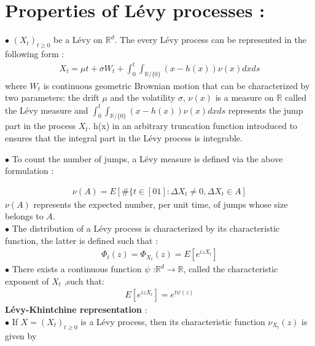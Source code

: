 \documentclass[12pt]{report}
\begin{document}
\section{Properties of  Lévy processes :}
$\bullet$  $(X_t)_{t \geqslant 0}$ be a Lévy  on $\mathbb{R}^d$. The every Lévy process can be represented in the following form :
\begin{gather}
X_t= \mu t+ \sigma W_t + \int_0^t \int_{\mathbb{R}/\{0\}} (x-h(x))\nu(x) dx ds 
\end{gather}
where $ W_t $ is continuous geometric  Brownian motion that can be characterized by two parameters: the drift $\mu$ and the volatility $\sigma$, $\nu(x)$ is a measure on $\mathbb{R}$ called the Lévy measure and  $\int_0^t\int_{\mathbb{R}/\{0\}}(x-h(x))\nu(x) dx ds$ represents the jump part in the process $X_t$. h(x) in an arbitrary truncation function introduced to ensures that the integral part in the Lévy process is integrable.\\


$\bullet$ To count the number of jumps, a Lévy measure is defined via the above formulation :

\begin{gather}
\nu(A)=E[\#\{t \in [0 1]: \Delta X_t \neq 0 , \Delta X_t \in A]
\end{gather}
$\nu(A)$ represents the expected number, per unit time, of jumps whose size belongs to $A$.\\
$\bullet$ The distribution of a Lévy process is characterized by its characteristic function, the latter is defined such that :\\
\begin{gather}
\Phi_t(z)=\Phi_{X_t}(z)=E[ e^{izX_t}]
\end{gather}
$\bullet$ There exists a continuous function $\psi $  :$\mathbb{R}^d  \rightarrow \mathbb{R} $, called the characteristic exponent of $X_t$ ,such that:\\
\begin{gather}
E[ e^{izX_t}]= e^ {t \psi (z)}
\end{gather}
\textbf{ Lévy-Khintchine representation} :\\

$\bullet$ If  $X = (X_t)_{t\geq 0}$  is a Lévy process, then its characteristic function  $\nu_{X_t}(z)$   is given by
\end{document}
